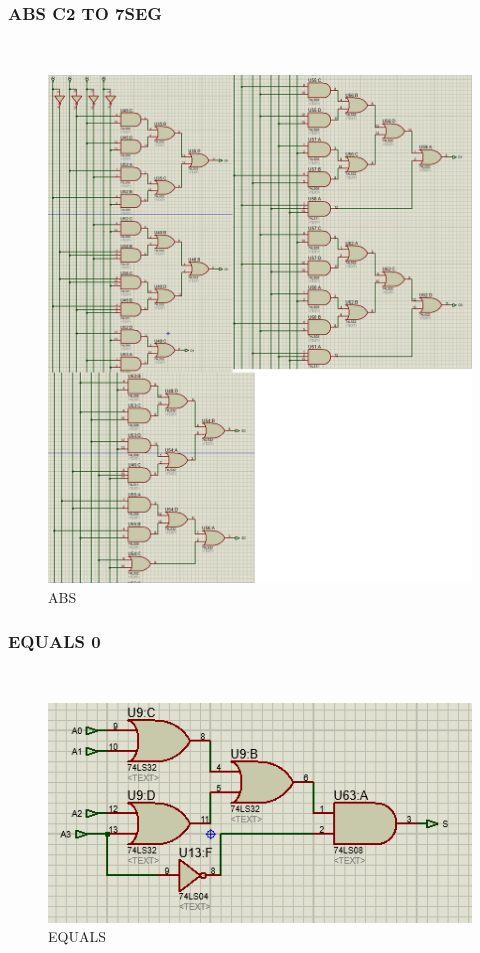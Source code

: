 \documentclass{article}
\begin{document}
\subsubsection{ABS C2 TO 7SEG} 
\begin{figure}[!h]
    \centering
    \includegraphics[scale =0.4]{ABS.PNG}
    \caption{ABS}
    \label{fig:ABS}
\end{figure}
\newpage
\subsubsection{EQUALS 0 } 
\begin{figure}[!h]
    \centering
    \includegraphics[scale =0.75]{EQUALS.PNG}
    \caption{EQUALS}
    \label{fig:EQUALS}
\end{figure}
\end{document}
